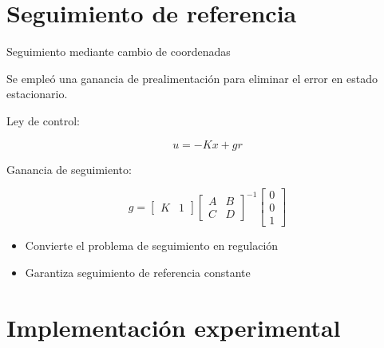 \documentclass[aspectratio=169]{beamer}
\begin{document}
\section{Seguimiento de referencia}

\begin{frame}{Seguimiento mediante cambio de coordenadas}

Se empleó una ganancia de prealimentación para eliminar el error en estado estacionario.

\vspace{0.4cm}

Ley de control:

\[
u=-Kx+gr
\]

\vspace{0.5cm}

Ganancia de seguimiento:

\[
g=
\begin{bmatrix}
K & 1
\end{bmatrix}
\begin{bmatrix}
A & B \\
C & D
\end{bmatrix}^{-1}
\begin{bmatrix}
0\\
0\\
1
\end{bmatrix}
\]

\vspace{0.5cm}

\begin{itemize}
\item Convierte el problema de seguimiento en regulación
\item Garantiza seguimiento de referencia constante
\end{itemize}

\end{frame}

\section{Implementación experimental}
\end{document}

